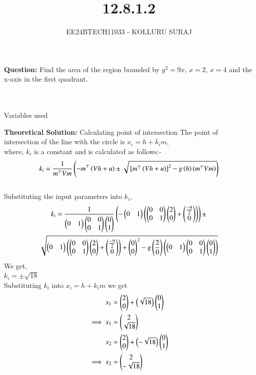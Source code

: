 \documentclass[journal]{IEEEtran}
\numberwithin{equation}{enumi}
\numberwithin{figure}{enumi}
\begin{document}

\title{12.8.1.2}
\author{EE24BTECH11033 - KOLLURU SURAJ}
{\let\newpage\relax\maketitle}
\textbf{Question:} 
Find the area of the region bounded by $y^2=9x$, $x=2$, $x=4$ and the x-axis in the first quadrant.
\\\\
\solution\\

\begin{table}[H]
    \centering
    
    \caption{Variables used}
    \label{tab1-1.2-20}
\end{table} 
\textbf{Theoretical Solution:}
Calculating point of intersection
The point of intersection of the line with the circle is $x_i=h+k_i m$,\\
where, $k_i$ is a constant and is calculated as follows:-
$$k_i=\frac{1}{m^\top Vm}\left(-m^\top \left(Vh+u\right)\pm \sqrt{{}\left[m^\top \left(Vh+u\right)\right]^2-g\left(h\right)\left(m^\top Vm\right)}\right)$$\\
Substituting the input parameters into $k_i$,\\
\begin{multline}
     k_i =\frac{1}{\begin{pmatrix}0 
 & 1\end{pmatrix}\begin{pmatrix}0 & 0 \\ 0 & 1\end{pmatrix}\begin{pmatrix}0 \\ 1\end{pmatrix}}\left(-\begin{pmatrix}0&1\end{pmatrix}\left(\begin{pmatrix}0&0\\0&1\end{pmatrix}\begin{pmatrix}2\\0\end{pmatrix}+\begin{pmatrix}\frac{-9}{2}\\0\end{pmatrix}\right)\right)\pm \\
     \sqrt{\begin{pmatrix}0&1\end{pmatrix}\left(\begin{pmatrix}0&0\\0&1\end{pmatrix}\begin{pmatrix}2\\0\end{pmatrix}+\begin{pmatrix}\frac{-9}{2}\\0\end{pmatrix}\right)+\begin{pmatrix}0\\0\end{pmatrix}^2-g\left(\frac{2}{0}\right)\left(\begin{pmatrix}0&1\end{pmatrix}\begin{pmatrix}0&0\\0&1\end{pmatrix}\begin{pmatrix}0\\1\end{pmatrix}\right)}
\end{multline}
We get,\\
$k_i= \pm \sqrt{18}$\\
Substituting $k_i$ into $x_i=h+k_i m$ we get\\
\begin{align}
     x_1&=\begin{pmatrix}2\\0\end{pmatrix}+\left(\sqrt{18}\right)\begin{pmatrix}0\\1\end{pmatrix}\\
    \implies x_1 &=\begin{pmatrix}2\\\sqrt{18}\end{pmatrix}\\
    x_2 &=\begin{pmatrix}2\\0\end{pmatrix}+\left(-\sqrt{18}\right)\begin{pmatrix}0\\1\end{pmatrix}\\
    \implies x_2&=\begin{pmatrix}2\\-\sqrt{18}\end{pmatrix}
\end{align}
\end{document}
